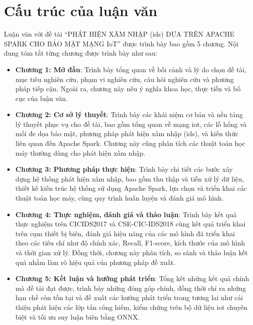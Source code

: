 \section{Cấu trúc của luận văn}
\label{sec:CauTruc}
Luận văn với đề tài ``PHÁT HIỆN XÂM NHẬP (\ac{ids}) DỰA TRÊN APACHE
SPARK CHO BẢO MẬT MẠNG IoT'' được trình bày bao gồm 5 chương. Nội dung tóm tắt từng chương được trình bày như sau:
\begin{itemize}
    \item \textbf{Chương 1: Mở đầu}: Trình bày tổng quan về bối cảnh và lý do chọn đề tài, mục tiêu nghiên cứu, phạm vi nghiên cứu, câu hỏi nghiên cứu và phương pháp tiếp cận. Ngoài ra, chương này nêu ý nghĩa khoa học, thực tiễn và bố cục của luận văn.
    \item \textbf{Chương 2: Cơ sở lý thuyết}: Trình bày các khái niệm cơ bản và nền tảng lý thuyết phục vụ cho đề tài, bao gồm tổng quan về mạng \ac{iot}, các lỗ hổng và mối đe dọa bảo mật, phương pháp phát hiện xâm nhập (\ac{ids}), và kiến thức liên quan đến Apache Spark. Chương này cũng phân tích các thuật toán học máy thường dùng cho phát hiện xâm nhập.
    \item \textbf{Chương 3: Phương pháp thực hiện}: Trình bày chi tiết các bước xây dựng hệ thống phát hiện xâm nhập, bao gồm thu thập và tiền xử lý dữ liệu, thiết kế kiến trúc hệ thống sử dụng Apache Spark, lựa chọn và triển khai các thuật toán học máy, cùng quy trình huấn luyện và đánh giá mô hình.
    \item \textbf{Chương 4: Thực nghiệm, đánh giá và thảo luận}: Trình bày kết quả thực nghiệm trên CICIDS2017 và CSE-CIC-IDS2018 cùng kết quả triển khai trên cụm thiết bị biên, đánh giá hiệu năng của các mô hình đã triển khai theo các tiêu chí như độ chính xác, Recall, F1-score, kích thước của mô hình và thời gian xử lý. Đồng thời, chương này phân tích, so sánh và thảo luận kết quả nhằm làm rõ hiệu quả của phương pháp đề xuất.
    \item \textbf{Chương 5: Kết luận và hướng phát triển}: Tổng kết những kết quả chính mà đề tài đạt được, trình bày những đóng góp chính, đồng thời chỉ ra những hạn chế còn tồn tại và đề xuất các hướng phát triển trong tương lai như cải thiện phát hiện các lớp tấn công hiếm, kiểm chứng trên bộ dữ liệu \ac{iot} chuyên biệt và tối ưu suy luận biên bằng ONNX.
\end{itemize}